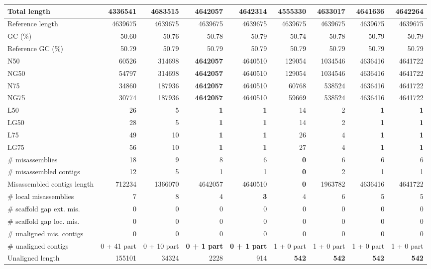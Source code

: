 \documentclass[12pt,a4paper]{article}
\begin{document}
\begin{table}[ht]
\begin{center}
\begin{tabular}{|l*{8}{|r}|}
Total length & 4336541 & {\bf 4683515} & 4642057 & 4642314 & 4555330 & 4633017 & 4641636 & 4642264 \\ \hline
Reference length & 4639675 & 4639675 & 4639675 & 4639675 & 4639675 & 4639675 & 4639675 & 4639675 \\ \hline
GC (\%) & 50.60 & 50.76 & 50.78 & 50.79 & 50.74 & 50.78 & 50.79 & 50.79 \\ \hline
Reference GC (\%) & 50.79 & 50.79 & 50.79 & 50.79 & 50.79 & 50.79 & 50.79 & 50.79 \\ \hline
N50 & 60526 & 314698 & {\bf 4642057} & 4640510 & 129054 & 1034546 & 4636416 & 4641722 \\ \hline
NG50 & 54797 & 314698 & {\bf 4642057} & 4640510 & 129054 & 1034546 & 4636416 & 4641722 \\ \hline
N75 & 34860 & 187936 & {\bf 4642057} & 4640510 & 60768 & 538524 & 4636416 & 4641722 \\ \hline
NG75 & 30774 & 187936 & {\bf 4642057} & 4640510 & 59669 & 538524 & 4636416 & 4641722 \\ \hline
L50 & 26 & 5 & {\bf 1} & {\bf 1} & 14 & 2 & {\bf 1} & {\bf 1} \\ \hline
LG50 & 28 & 5 & {\bf 1} & {\bf 1} & 14 & 2 & {\bf 1} & {\bf 1} \\ \hline
L75 & 49 & 10 & {\bf 1} & {\bf 1} & 26 & 4 & {\bf 1} & {\bf 1} \\ \hline
LG75 & 56 & 10 & {\bf 1} & {\bf 1} & 27 & 4 & {\bf 1} & {\bf 1} \\ \hline
\# misassemblies & 18 & 9 & 8 & 6 & {\bf 0} & 6 & 6 & 6 \\ \hline
\# misassembled contigs & 12 & 5 & 1 & 1 & {\bf 0} & 2 & 1 & 1 \\ \hline
Misassembled contigs length & 712234 & 1366070 & 4642057 & 4640510 & {\bf 0} & 1963782 & 4636416 & 4641722 \\ \hline
\# local misassemblies & 7 & 8 & 4 & {\bf 3} & 4 & 6 & 5 & 5 \\ \hline
\# scaffold gap ext. mis. & 0 & 0 & 0 & 0 & 0 & 0 & 0 & 0 \\ \hline
\# scaffold gap loc. mis. & 0 & 0 & 0 & 0 & 0 & 0 & 0 & 0 \\ \hline
\# unaligned mis. contigs & 0 & 0 & 0 & 0 & 0 & 0 & 0 & 0 \\ \hline
\# unaligned contigs & 0 + 41 part & 0 + 10 part & {\bf 0 + 1 part} & {\bf 0 + 1 part} & 1 + 0 part & 1 + 0 part & 1 + 0 part & 1 + 0 part \\ \hline
Unaligned length & 155101 & 34324 & 2228 & 914 & {\bf 542} & {\bf 542} & {\bf 542} & {\bf 542} \\ \hline

\end{tabular}
\end{center}
\end{table}
\end{document}
